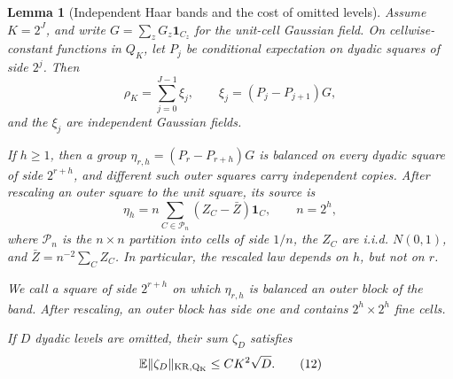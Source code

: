 \documentclass[11pt,reqno]{amsart}
\theoremstyle{plain}
\newtheorem{lemma}[theorem]{Lemma}
\theoremstyle{definition}
\theoremstyle{remark}
\numberwithin{equation}{section}
\newcommand{\1}{\mathbf 1}
\begin{document}
\begin{lemma}[Independent Haar bands and the cost of omitted levels]\label{lem:dyadic-bands}
Assume $K=2^J$, and write $G=\sum_zG_z\mathbf1_{C_z}$ for the
unit-cell Gaussian field.  On cellwise-constant functions in $Q_ K$, let $P_ j$
be conditional expectation on dyadic squares of side $2^j$. Then
\begin{equation}
\rho_ K=\sum_ {j=0}^{J-1}\xi_ j,
\qquad \xi_ j=(P_ j-P_ {j+1})G,
\tag{10}
\end{equation}
and the $\xi_ j$ are independent Gaussian fields.

If $h\geq1$, then a group
$\eta_ {r,h}=(P_ r-P_ {r+h})G$ is balanced on every dyadic square of side
$2^{r+h}$, and different such outer squares carry independent copies.
After rescaling an outer square to the unit square, its source is
\begin{equation}
\eta_ h=n\sum_ {C\in\mathcal P_ n}(Z_ C-\bar Z)\mathbf1_ C,
\qquad n=2^h,
\tag{11}
\end{equation}
where $\mathcal P_ n$ is the $n\times n$ partition into cells of side
$1/n$, the $Z_ C$ are i.i.d. $N(0,1)$, and
$\bar Z=n^{-2}\sum_ CZ_ C$. In particular, the rescaled law depends on
$h$, but not on $r$.

We call a square of side $2^{r+h}$ on which $\eta_{r,h}$ is balanced an
\emph{outer block} of the band.  After rescaling, an outer block has side
one and contains $2^h\times2^h$ fine cells.

If $D$ dyadic levels are omitted, their sum $\zeta_ D$ satisfies
\begin{equation}
\mathbb E\|\zeta_ D\|_ {\rm KR,Q_ K}\leq CK^2\sqrt D.
\tag{12}
\end{equation}

\end{lemma}
\end{document}
